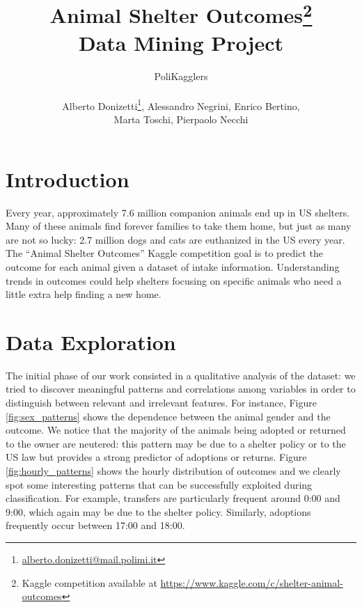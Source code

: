 \documentclass[a4paper,11pt]{article}
\begin{document}
\title{\Huge{Animal Shelter Outcomes\footnote{Kaggle competition available at \url{https://www.kaggle.com/c/shelter-animal-outcomes}}}\\
	\LARGE{Data Mining Project}}
\author{\Large{PoliKagglers}\\ \\
	Alberto Donizetti\footnote{\href{mailto:alberto.donizetti@mail.polimi.it}{alberto.donizetti@mail.polimi.it}}, Alessandro Negrini, Enrico Bertino,\\ Marta Toschi, Pierpaolo Necchi}
\maketitle

\section{Introduction}
Every year, approximately 7.6 million companion animals end up in US shelters. Many of these animals find forever families to take them home, but just as many are not so lucky: 2.7 million dogs and cats are euthanized in the US every year. The ``Animal Shelter Outcomes'' Kaggle competition goal is to predict the outcome for each animal given a dataset of intake information. Understanding trends in outcomes could help shelters focusing on specific animals who need a little extra help finding a new home.  

\section{Data Exploration}
The initial phase of our work consisted in a qualitative analysis of the dataset: we tried to discover meaningful patterns and correlations among variables in order to distinguish between relevant and irrelevant features. For instance, Figure \ref{fig:sex_patterns} shows the dependence between the animal gender and the outcome. We notice that the majority of the animals being adopted or returned to the owner are neutered: this pattern may be due to a shelter policy or to the US law but provides a strong predictor of adoptions or returns. Figure \ref{fig:hourly_patterns} shows the hourly distribution of outcomes and we clearly spot some interesting patterns that can be successfully exploited during classification. For example, transfers are particularly frequent around 0:00 and 9:00, which again may be due to the shelter policy. Similarly, adoptions frequently occur between 17:00 and 18:00.
\end{document}
